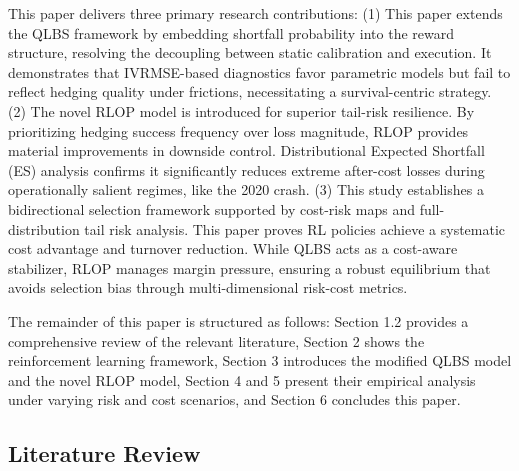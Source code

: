 This paper delivers three primary research contributions: (1) This paper extends the QLBS framework by embedding shortfall probability into the reward structure, resolving the decoupling between static calibration and execution. It demonstrates that IVRMSE-based diagnostics favor parametric models but fail to reflect hedging quality under frictions, necessitating a survival-centric strategy. (2) The novel RLOP model is introduced for superior tail-risk resilience. By prioritizing hedging success frequency over loss magnitude, RLOP provides material improvements in downside control. Distributional Expected Shortfall (ES) analysis confirms it significantly reduces extreme after-cost losses during operationally salient regimes, like the 2020 crash. (3) This study establishes a bidirectional selection framework supported by cost-risk maps and full-distribution tail risk analysis. This paper proves RL policies achieve a systematic cost advantage and turnover reduction. While QLBS acts as a cost-aware stabilizer, RLOP manages margin pressure, ensuring a robust equilibrium that avoids selection bias through multi-dimensional risk-cost metrics.

The remainder of this paper is structured as follows: Section 1.2 provides a comprehensive review of the relevant literature, Section 2 shows the reinforcement learning framework, Section 3 introduces the modified QLBS model and the novel RLOP model, Section 4 and 5 present their empirical analysis under varying risk and cost scenarios, and Section 6 concludes this paper.

\subsection{Literature Review}
 
